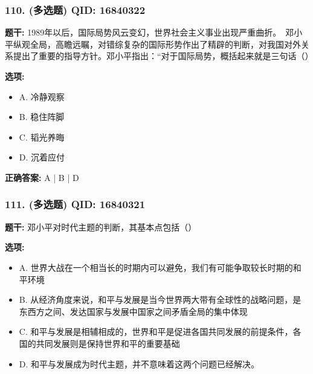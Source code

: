 \documentclass[12pt,UTF8]{ctexart}
\begin{document}
\subsubsection*{110. (多选题) \small QID: 16840322}

\textbf{题干:}
1989年以后，国际局势风云变幻，世界社会主义事业出现严重曲折。　邓小平纵观全局，高瞻远瞩，对错综复杂的国际形势作出了精辟的判断，对我国对外关系提出了重要的指导方针。邓小平指出：“对于国际局势，概括起来就是三句话（）

\textbf{选项:}
\begin{itemize}[leftmargin=*]

  \item A. 冷静观察

  \item B. 稳住阵脚

  \item C. 韬光养晦

  \item D. 沉着应付

\end{itemize}

\textbf{正确答案:}
A | B | D

\vspace{0.3em}\hrulefill\vspace{0.7em}

\subsubsection*{111. (多选题) \small QID: 16840321}

\textbf{题干:}
邓小平对时代主题的判断，其基本点包括（）

\textbf{选项:}
\begin{itemize}[leftmargin=*]

  \item A. 世界大战在一个相当长的时期内可以避免，我们有可能争取较长时期的和平环境

  \item B. 从经济角度来说，和平与发展是当今世界两大带有全球性的战略问题，是东西方之间、发达国家与发展中国家之间矛盾全局的集中体现

  \item C. 和平与发展是相辅相成的，世界和平是促进各国共同发展的前提条件，各国的共同发展则是保持世界和平的重要基础

  \item D. 和平与发展成为时代主题，并不意味着这两个问题已经解决。

\end{itemize}
\end{document}
